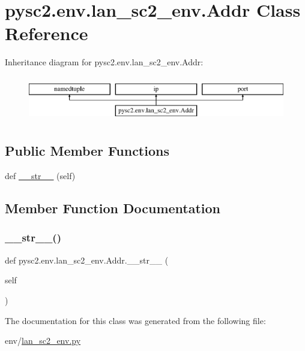 \hypertarget{classpysc2_1_1env_1_1lan__sc2__env_1_1_addr}{}\section{pysc2.\+env.\+lan\+\_\+sc2\+\_\+env.\+Addr Class Reference}
\label{classpysc2_1_1env_1_1lan__sc2__env_1_1_addr}
Inheritance diagram for pysc2.\+env.\+lan\+\_\+sc2\+\_\+env.\+Addr\+:\begin{figure}[H]
\begin{center}
\leavevmode
\includegraphics[height=1.996435cm]{classpysc2_1_1env_1_1lan__sc2__env_1_1_addr}
\end{center}
\end{figure}
\subsection*{Public Member Functions}
\begin{DoxyCompactItemize}
\item 
def \mbox{\hyperlink{classpysc2_1_1env_1_1lan__sc2__env_1_1_addr_a7365bf76a5c653b039ec16e22360a7b3}{\+\_\+\+\_\+str\+\_\+\+\_\+}} (self)
\end{DoxyCompactItemize}


\subsection{Member Function Documentation}
\mbox{\label{classpysc2_1_1env_1_1lan__sc2__env_1_1_addr_a7365bf76a5c653b039ec16e22360a7b3}} 
\subsubsection{\texorpdfstring{\+\_\+\+\_\+str\+\_\+\+\_\+()}{\_\_str\_\_()}}
{\footnotesize\ttfamily def pysc2.\+env.\+lan\+\_\+sc2\+\_\+env.\+Addr.\+\_\+\+\_\+str\+\_\+\+\_\+ (\begin{DoxyParamCaption}\item[{}]{self }\end{DoxyParamCaption})}



The documentation for this class was generated from the following file\+:\begin{DoxyCompactItemize}
\item 
env/\mbox{\hyperlink{lan__sc2__env_8py}{lan\+\_\+sc2\+\_\+env.\+py}}\end{DoxyCompactItemize}
